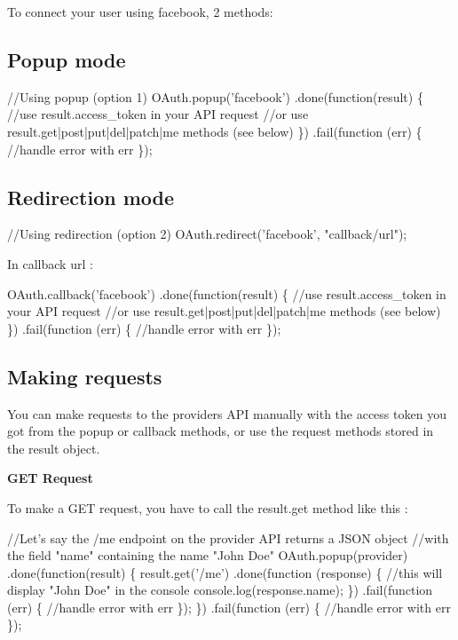 To connect your user using facebook, 2 methods\+:

\subsection*{Popup mode }


\begin{DoxyCode}
//Using popup (option 1)
OAuth.popup('facebook')
.done(function(result) \{
  //use result.access\_token in your API request 
  //or use result.get|post|put|del|patch|me methods (see below)
\})
.fail(function (err) \{
  //handle error with err
\});
\end{DoxyCode}


\subsection*{Redirection mode }


\begin{DoxyCode}
//Using redirection (option 2)
OAuth.redirect('facebook', "callback/url");
\end{DoxyCode}


In callback url \+:


\begin{DoxyCode}
OAuth.callback('facebook')
.done(function(result) \{
    //use result.access\_token in your API request
    //or use result.get|post|put|del|patch|me methods (see below)
\})
.fail(function (err) \{
    //handle error with err
\});
\end{DoxyCode}


\subsection*{Making requests }

You can make requests to the provider\textquotesingle{}s A\+PI manually with the access token you got from the {\ttfamily popup} or {\ttfamily callback} methods, or use the request methods stored in the {\ttfamily result} object.

{\bfseries G\+ET Request}

To make a G\+ET request, you have to call the {\ttfamily result.\+get} method like this \+:


\begin{DoxyCode}
//Let's say the /me endpoint on the provider API returns a JSON object
//with the field "name" containing the name "John Doe"
OAuth.popup(provider)
.done(function(result) \{
    result.get('/me')
    .done(function (response) \{
        //this will display "John Doe" in the console
        console.log(response.name);
    \})
    .fail(function (err) \{
        //handle error with err
    \});
\})
.fail(function (err) \{
    //handle error with err
\});
\end{DoxyCode}


